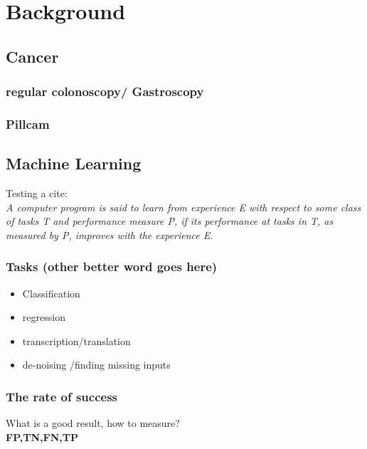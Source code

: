 \documentclass[a4paper,english]{ifimaster}
\begin{document}
		
\chapter{Background}
	\section{Cancer}
	  \subsection{regular colonoscopy/ Gastroscopy}
	  \subsection{Pillcam}
	  
	  
	\section{Machine Learning}



	Testing a cite:\\

	\textit{ A computer program is said to learn from experience E with respect to 
	some class of tasks T and performance measure P, if its performance at
	tasks in T, as measured by P, improves with the experience E. } 
	\cite{MitchellTomM1997Ml}
	  \subsection{Tasks (other better word goes here)}
\label{chap:Tasks}
\begin{itemize}
 \item Classification
 \item regression 
 \item transcription/translation
 \item de-noising /finding missing inputs
\end{itemize}
\subsection{The rate of success}
What is a good result, how to measure?\\
\textbf{FP,TN,FN,TP}\\


\end{document}
